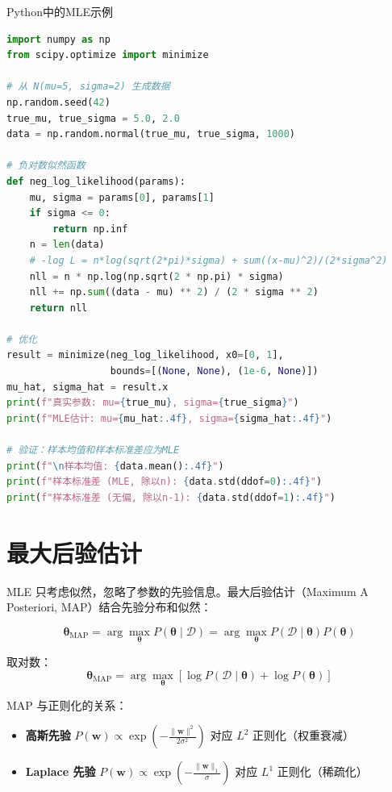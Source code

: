 \begin{mycode}{Python中的MLE示例}
\begin{lstlisting}[language=Python]
import numpy as np
from scipy.optimize import minimize

# 从 N(mu=5, sigma=2) 生成数据
np.random.seed(42)
true_mu, true_sigma = 5.0, 2.0
data = np.random.normal(true_mu, true_sigma, 1000)

# 负对数似然函数
def neg_log_likelihood(params):
    mu, sigma = params[0], params[1]
    if sigma <= 0:
        return np.inf
    n = len(data)
    # -log L = n*log(sqrt(2*pi)*sigma) + sum((x-mu)^2)/(2*sigma^2)
    nll = n * np.log(np.sqrt(2 * np.pi) * sigma)
    nll += np.sum((data - mu) ** 2) / (2 * sigma ** 2)
    return nll

# 优化
result = minimize(neg_log_likelihood, x0=[0, 1],
                  bounds=[(None, None), (1e-6, None)])
mu_hat, sigma_hat = result.x
print(f"真实参数: mu={true_mu}, sigma={true_sigma}")
print(f"MLE估计: mu={mu_hat:.4f}, sigma={sigma_hat:.4f}")

# 验证：样本均值和样本标准差应为MLE
print(f"\n样本均值: {data.mean():.4f}")
print(f"样本标准差 (MLE, 除以n): {data.std(ddof=0):.4f}")
print(f"样本标准差 (无偏, 除以n-1): {data.std(ddof=1):.4f}")
\end{lstlisting}
\end{mycode}

\section{最大后验估计}

MLE 只考虑似然，忽略了参数的先验信息。最大后验估计（Maximum A Posteriori, MAP）结合先验分布和似然：

\[
\boldsymbol{\theta}_{\mathrm{MAP}} = \arg\max_{\boldsymbol{\theta}} P(\boldsymbol{\theta}\mid\mathcal{D})
= \arg\max_{\boldsymbol{\theta}} P(\mathcal{D}\mid\boldsymbol{\theta})P(\boldsymbol{\theta})
\]

取对数：
\[
\boldsymbol{\theta}_{\mathrm{MAP}} = \arg\max_{\boldsymbol{\theta}} \left[\log P(\mathcal{D}\mid\boldsymbol{\theta}) + \log P(\boldsymbol{\theta})\right]
\]

MAP 与正则化的关系：
\begin{itemize}
    \item \textbf{高斯先验} $P(\mathbf{w})\propto\exp(-\frac{\|\mathbf{w}\|^2}{2\sigma^2})$ 对应 $L^2$ 正则化（权重衰减）
    \item \textbf{Laplace 先验} $P(\mathbf{w})\propto\exp(-\frac{\|\mathbf{w}\|_1}{\sigma})$ 对应 $L^1$ 正则化（稀疏化）
\end{itemize}

